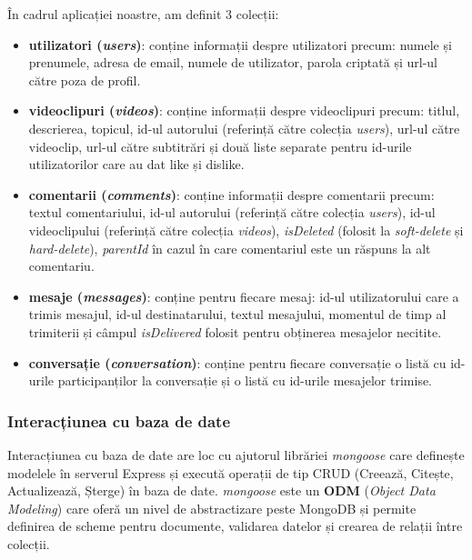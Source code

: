 \par
În cadrul aplicației noastre, am definit 3 colecții:
\begin{itemize}
    \item \textbf{utilizatori (\textit{users})}: conține informații despre utilizatori precum: numele și prenumele, adresa de
    email, numele de utilizator, parola criptată și url-ul către poza de profil.
    \item \textbf{videoclipuri (\textit{videos})}: conține informații despre videoclipuri precum: titlul, descrierea, topicul,
    id-ul autorului (referință către colecția \textit{users}), url-ul către videoclip, url-ul către
    subtitrări și două liste separate pentru id-urile utilizatorilor care au dat like și dislike.
    \item \textbf{comentarii (\textit{comments})}: conține informații despre comentarii precum: textul comentariului, 
    id-ul autorului (referință către colecția \textit{users}), id-ul videoclipului (referință către
    colecția \textit{videos}), \textit{isDeleted} (folosit la \textit{soft-delete} și \textit{hard-delete}), 
    \textit{parentId} în cazul în care comentariul este un răspuns la alt comentariu.
    \item \textbf{mesaje (\textit{messages})}: conține pentru fiecare mesaj: id-ul utilizatorului care a trimis mesajul,
    id-ul destinatarului, textul mesajului, momentul de timp al trimiterii și câmpul \textit{isDelivered} folosit pentru
    obținerea mesajelor necitite.
    \item \textbf{conversație (\textit{conversation})}: conține pentru fiecare conversație o listă cu id-urile participanților
    la conversație și o listă cu id-urile mesajelor trimise.
\end{itemize}

\subsubsection{Interacțiunea cu baza de date}

\par
Interacțiunea cu baza de date are loc cu ajutorul librăriei \textit{mongoose} care definește modelele
în serverul Express și execută operații de tip CRUD (Creează, Citește, Actualizează, Șterge) în baza de date.
\textit{mongoose} este un \textbf{ODM} (\textit{Object Data Modeling}) care oferă un nivel de abstractizare peste MongoDB
și permite definirea de scheme pentru documente, validarea datelor și crearea de relații între colecții.

